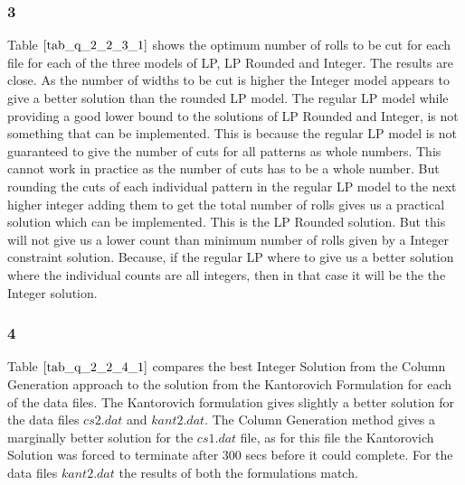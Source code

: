 \documentclass[twoside,12pt]{article}
\begin{document}
\subsubsection{3}
\label{p1_s2_q3}
Table $\eqref{tab_q_2_2_3_1}$ shows the optimum number of rolls to be cut for each file for each of the three models of LP, LP Rounded and Integer. The results are close. As the number of widths to be cut is higher the Integer model appears to give a better solution than the rounded LP model. The regular LP model while providing a good lower bound to the solutions of LP Rounded and Integer, is not something that can be implemented. This is because the regular LP model is not guaranteed  to give the number of cuts for all patterns as whole numbers. This cannot work in practice as the number of cuts has to be a whole number. But rounding the cuts of each individual pattern in the regular LP model to the next higher integer adding them to get the total number of rolls gives us a practical solution which can be implemented. This is the LP Rounded solution. But this will not give us a lower count than minimum number of rolls given by a Integer constraint solution. Because, if the regular LP where to give us a better solution where the individual counts are all integers, then in that case it will be the the Integer solution. 

\begin{table}[h]
\centering
{}
	\caption[]{Compare No. Rolls to be cut - LP, LP Rounded and Integer approaches }
	\label{tab_q_2_2_3_1}
\end{table}


\subsubsection{4}
\label{p1_s2_q4}

Table $\eqref{tab_q_2_2_4_1}$ compares the best Integer Solution from the Column Generation approach to the solution from the Kantorovich Formulation for each of the data files. The Kantorovich formulation gives slightly a better solution for the data files $cs2.dat$ and $kant2.dat$. The Column Generation method gives a marginally better solution for the $cs1.dat$ file, as for this file the Kantorovich Solution was forced to terminate after 300 secs before it could complete. For the data files $kant2.dat$ the results of both the formulations match.
\end{document}
